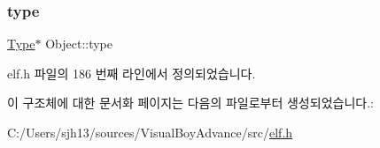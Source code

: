 \subsubsection{\texorpdfstring{type}{type}}
{\footnotesize\ttfamily \mbox{\hyperlink{struct_type}{Type}}$\ast$ Object\+::type}



elf.\+h 파일의 186 번째 라인에서 정의되었습니다.



이 구조체에 대한 문서화 페이지는 다음의 파일로부터 생성되었습니다.\+:\begin{DoxyCompactItemize}
\item 
C\+:/\+Users/sjh13/sources/\+Visual\+Boy\+Advance/src/\mbox{\hyperlink{elf_8h}{elf.\+h}}\end{DoxyCompactItemize}
